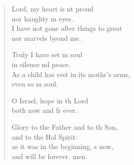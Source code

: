 \settowidth{\versewidth}{As a child has rest in its mother’s arms, *}
\begin{verse}%
  \begin{patverse}
 Lord, my heart is nt proud\Med\\
nor haughty m eyes.\\
I have not gone after things to great\Med\\
nor marvels byond me.

Truly I have set m soul\Med\\
in silence nd peace.\\
As a child has rest in its mothr’s arms,\Med\\
even so m soul.

O Israel, hope in th Lord\Med\\
both now and fr ever.

Glory to the Father and to th Son,\Med\\
and to the Hol Spirit:\\
as it was in the beginning, \pointup{\i}s now,\Med\\
and will be forever. men.
  \end{patverse}
\end{verse}
